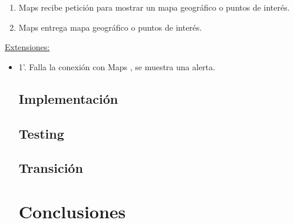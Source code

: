 \documentclass[12pt]{article}
\begin{document}
\begin{enumerate}
\item Maps recibe petición para mostrar un mapa geográfico o puntos de interés.
\item Maps entrega mapa geográfico o puntos de interés.
\end{enumerate}
\underline{Extensiones:}
\begin{itemize}
\item1’. Falla la conexión con Maps , se muestra una alerta.

\subsection{Implementación}
\subsection{Testing}
\subsection{Transición}
\section{Conclusiones}
\end{itemize}
\end{document}
